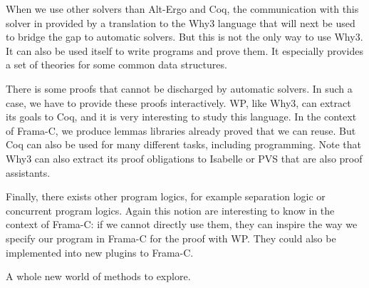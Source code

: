 \documentclass[middle]{zmdocument}
\begin{document}
When we use other solvers than Alt-Ergo and Coq, the communication with
this solver in provided by a translation to the Why3 language that will
next be used to bridge the gap to automatic solvers. But this is not the
only way to use Why3. It can also be used itself to write programs and
prove them. It especially provides a set of theories for some common
data structures.

There is some proofs that cannot be discharged by automatic solvers. In
such a case, we have to provide these proofs interactively. WP, like
Why3, can extract its goals to Coq, and it is very interesting to study
this language. In the context of Frama-C, we produce lemmas libraries
already proved that we can reuse. But Coq can also be used for many
different tasks, including programming. Note that Why3 can also extract
its proof obligations to Isabelle or PVS that are also proof assistants.

Finally, there exists other program logics, for example separation logic
or concurrent program logics. Again this notion are interesting to know
in the context of Frama-C: if we cannot directly use them, they can
inspire the way we specify our program in Frama-C for the proof with WP.
They could also be implemented into new plugins to Frama-C.

A whole new world of methods to explore.
\end{document}
